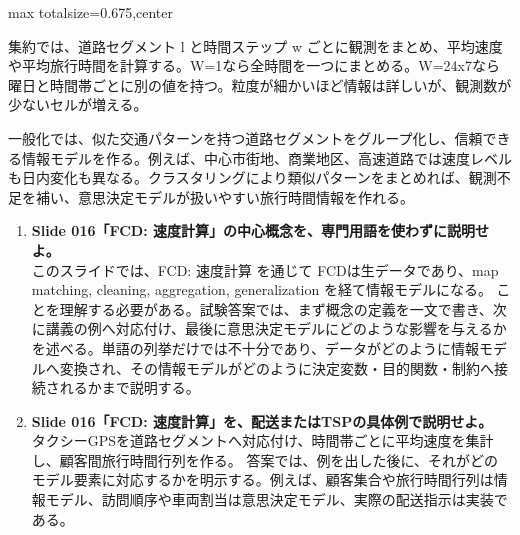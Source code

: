 \begin{adjustbox}{max totalsize={\textwidth}{0.675\textheight},center}
\begin{minipage}{\textwidth}
\begin{minipage}[t]{0.485\textwidth}
集約では、道路セグメント l と時間ステップ w ごとに観測をまとめ、平均速度や平均旅行時間を計算する。W=1なら全時間を一つにまとめる。W=24x7なら曜日と時間帯ごとに別の値を持つ。粒度が細かいほど情報は詳しいが、観測数が少ないセルが増える。\par
一般化では、似た交通パターンを持つ道路セグメントをグループ化し、信頼できる情報モデルを作る。例えば、中心市街地、商業地区、高速道路では速度レベルも日内変化も異なる。クラスタリングにより類似パターンをまとめれば、観測不足を補い、意思決定モデルが扱いやすい旅行時間情報を作れる。\par
{}
\begin{enumerate}
\item \textbf{Slide 016「FCD: 速度計算」の中心概念を、専門用語を使わずに説明せよ。}\\このスライドでは、FCD: 速度計算 を通じて FCDは生データであり、map matching, cleaning, aggregation, generalization を経て情報モデルになる。 ことを理解する必要がある。試験答案では、まず概念の定義を一文で書き、次に講義の例へ対応付け、最後に意思決定モデルにどのような影響を与えるかを述べる。単語の列挙だけでは不十分であり、データがどのように情報モデルへ変換され、その情報モデルがどのように決定変数・目的関数・制約へ接続されるかまで説明する。
\item \textbf{Slide 016「FCD: 速度計算」を、配送またはTSPの具体例で説明せよ。}\\タクシーGPSを道路セグメントへ対応付け、時間帯ごとに平均速度を集計し、顧客間旅行時間行列を作る。 答案では、例を出した後に、それがどのモデル要素に対応するかを明示する。例えば、顧客集合や旅行時間行列は情報モデル、訪問順序や車両割当は意思決定モデル、実際の配送指示は実装である。
\end{enumerate}
\end{minipage}
\end{minipage}
\end{adjustbox}


